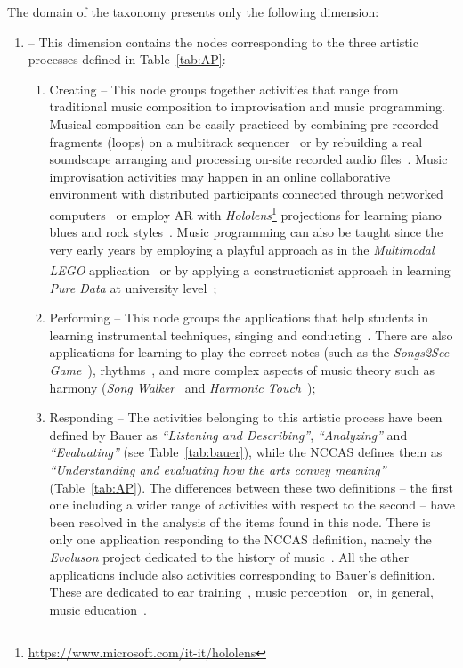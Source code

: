 \documentclass[journal]{IEEEtran}
\newcommand{\domain}[1]{{\fontfamily{cmss}\selectfont {\textsc{#1}}}}
\newcommand{\dimension}[1]{{\fontfamily{cmss}\selectfont {\textit{#1}}}}
\newcommand{\node}[1]{{\fontfamily{cmss}\selectfont #1}}
\begin{document}
The \domain{Musical} domain of the taxonomy presents only the following dimension:
\begin{enumerate}[label=2.\arabic*.,leftmargin=0.7cm,listparindent=-\leftmargin, start=0]
\item \dimension{Activity} -- This dimension contains the nodes corresponding to the three artistic processes defined in Table~\ref{tab:AP}:

\begin{enumerate}[label=2.0.\arabic*.,leftmargin=0.9cm,listparindent=-\leftmargin, start=0]

\item \node{Creating} -- This node groups together activities that range from traditional music composition to improvisation and music programming. Musical composition can be easily practiced by combining pre-recorded fragments (loops) on a multitrack sequencer~\cite{gall2005music} or by rebuilding a real soundscape arranging and processing on-site recorded audio files~\cite{savage2001dunwich}. Music improvisation activities may happen in an online collaborative environment with distributed participants connected through networked computers~\cite{brown2007networked} or employ AR with \textit{Hololens}\footnote{\url{https://www.microsoft.com/it-it/hololens}} projections for learning piano blues and rock styles~\cite{das2017music}. Music programming can also be taught since the very early years by employing a playful approach as in the \textit{Multimodal LEGO\textsuperscript{\textregistered}} application~\cite{blm2017fosteringcomputational, ludovico2017multimodal} or by applying a constructionist approach in learning \textit{Pure Data} at university level~\cite{hancock2014play};
\item \node{Performing} -- This node groups the applications that help students in learning instrumental techniques, singing and conducting~\cite{hollinger2005effects,lee2004you}. There are also applications for learning to play the correct notes (such as the \textit{Songs2See Game}~\cite{dittmar2012music}), rhythms~\cite{chou}, and more complex aspects of music theory such as harmony (\textit{Song Walker}~\cite{bouwer} and \textit{Harmonic Touch}~\cite{mandanici});
\item \node{Responding} -- The activities belonging to this artistic process have been defined by Bauer as \textit{``Listening and Describing''}, \textit{``Analyzing''} and \textit{``Evaluating''} (see Table~\ref{tab:bauer}), while the NCCAS defines them as \textit{``Understanding and evaluating how the arts convey meaning''} (Table~\ref{tab:AP}). The differences between these two definitions -- the first one including a wider range of activities with respect to the second -- have been resolved in the analysis of the items found in this node. There is only one application responding to the NCCAS definition, namely the \textit{Evoluson} project dedicated to the history of music~\cite{gaugne2018evoluson}. All the other applications include also activities corresponding to Bauer's definition. These are dedicated to ear training~\cite{portowitz2014harmony}, music perception~\cite{farinazzo} or, in general, music education~\cite{frosini}.
\end{enumerate}
\end{enumerate}
\end{document}
